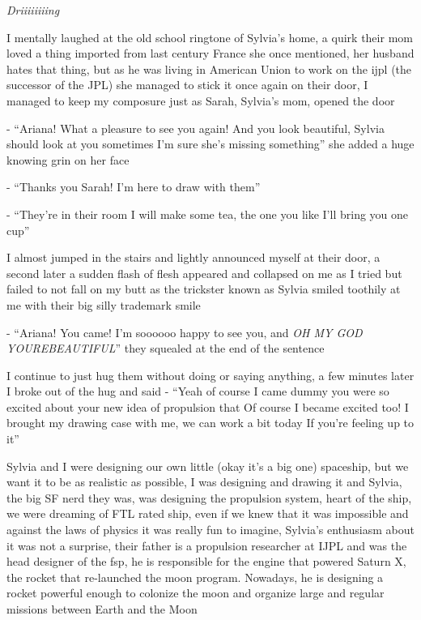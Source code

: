 \documentclass[hidelinks,12pt,a4paper]{book}
\begin{document}
\textit{Driiiiiiiing}\par
I mentally laughed at the old school ringtone of Sylvia's home, 
a quirk their mom loved a thing imported from last century France she once mentioned, 
her husband hates that thing, but as he was living in American Union to work on the 
\gls{ijpl} (the successor of the JPL) she managed to stick it once again on their door, 
I managed to keep my composure just as Sarah, Sylvia's mom, opened the door\par
\bigskip

- “Ariana! What a pleasure to see you again! And you look beautiful, 
Sylvia should look at you sometimes I'm sure she's missing something” she added a huge knowing grin on her face\par
- “Thanks you Sarah! I'm here to draw with them”\par 
- “They're in their room I will make some tea, the one you like I'll bring you one cup”\par
\bigskip

I almost jumped in the stairs and lightly announced myself at their door, 
a second later a sudden flash of flesh appeared and collapsed on me as 
I tried but failed to not fall on my butt as the trickster known as Sylvia smiled 
toothily at me with their big silly trademark smile\newline

- “Ariana! You came! I'm soooooo happy to see you, and \textit{OH MY GOD YOUREBEAUTIFUL}” they squealed at the end of the sentence\par
\bigskip

I continue to just hug them without doing or saying anything, a few minutes later I broke out of the hug and said\newline
- “Yeah of course I came dummy you were so excited about your new idea of propulsion that 
Of course I became excited too! I brought my drawing case with me, we can work a bit today If you're feeling up to it”\par
\bigskip

Sylvia and I were designing our own little (okay it's a big one) spaceship,
 but we want it to be as realistic as possible, I was designing and drawing it and Sylvia, 
 the big SF nerd they was, was designing the propulsion system, heart of the ship, 
 we were dreaming of FTL rated ship, even if we knew that it was impossible and against the laws of physics 
 it was really fun to imagine, Sylvia's enthusiasm about it was not a surprise, their father is a propulsion 
 researcher at IJPL and was the head designer of the \gls{fsp}, he is responsible for the engine 
 that powered Saturn X, the rocket that re-launched the moon program. Nowadays, he is designing a rocket powerful 
 enough to colonize the moon and organize large and regular missions between Earth and the Moon\par
 \bigskip
\end{document}
